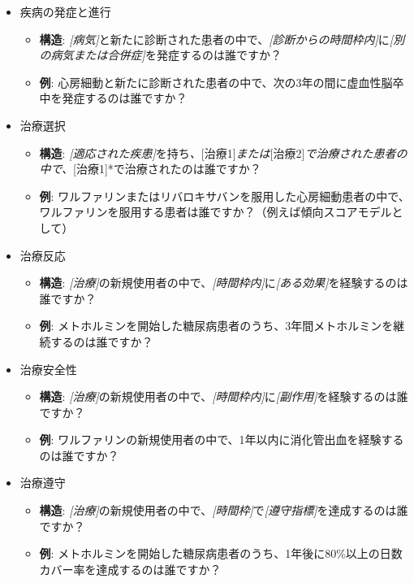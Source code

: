 \documentclass[
  11pt]{book}
\providecommand{\tightlist}{%
  \setlength{\itemsep}{0pt}\setlength{\parskip}{0pt}}
\theoremstyle{definition}
\theoremstyle{definition}
\theoremstyle{definition}
\theoremstyle{definition}
\theoremstyle{remark}
\begin{document}
\begin{itemize}
\tightlist
\item
  疾病の発症と進行

  \begin{itemize}
  \tightlist
  \item
    \textbf{構造}: \emph{{[}病気{]}}と新たに診断された患者の中で、\emph{{[}診断からの時間枠内{]}}に\emph{{[}別の病気または合併症{]}}を発症するのは誰ですか？
  \item
    \textbf{例}: 心房細動と新たに診断された患者の中で、次の3年の間に虚血性脳卒中を発症するのは誰ですか？
  \end{itemize}
\item
  治療選択

  \begin{itemize}
  \tightlist
  \item
    \textbf{構造}: \emph{{[}適応された疾患{]}}を持ち\emph{、}{[}治療1{]}\emph{または}{[}治療2{]}\emph{で治療された患者の中で、}{[}治療1{]}*で治療されたのは誰ですか？
  \item
    \textbf{例}: ワルファリンまたはリバロキサバンを服用した心房細動患者の中で、ワルファリンを服用する患者は誰ですか？（例えば傾向スコアモデルとして）
  \end{itemize}
\item
  治療反応

  \begin{itemize}
  \tightlist
  \item
    \textbf{構造}: \emph{{[}治療{]}}の新規使用者の中で、\emph{{[}時間枠内{]}}に\emph{{[}ある効果{]}}を経験するのは誰ですか？
  \item
    \textbf{例}: メトホルミンを開始した糖尿病患者のうち、3年間メトホルミンを継続するのは誰ですか？
  \end{itemize}
\item
  治療安全性

  \begin{itemize}
  \tightlist
  \item
    \textbf{構造}: \emph{{[}治療{]}}の新規使用者の中で、\emph{{[}時間枠内{]}}に\emph{{[}副作用{]}}を経験するのは誰ですか？
  \item
    \textbf{例}: ワルファリンの新規使用者の中で、1年以内に消化管出血を経験するのは誰ですか？
  \end{itemize}
\item
  治療遵守

  \begin{itemize}
  \tightlist
  \item
    \textbf{構造}: \emph{{[}治療{]}}の新規使用者の中で、\emph{{[}時間枠{]}}で\emph{{[}遵守指標{]}}を達成するのは誰ですか？
  \item
    \textbf{例}: メトホルミンを開始した糖尿病患者のうち、1年後に80\%以上の日数カバー率を達成するのは誰ですか？
  \end{itemize}
\end{itemize}
\end{document}
